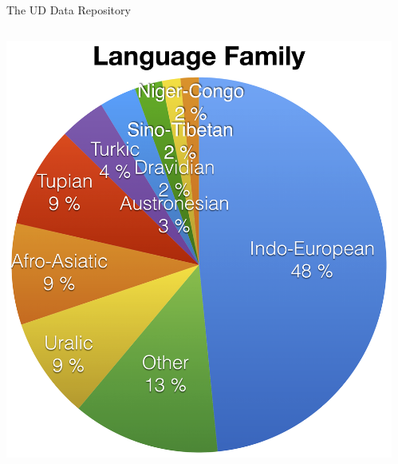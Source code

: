 \documentclass[10pt, compress, aspectratio=169]{beamer}
\begin{document}
\begin{frame}{The UD Data Repository}
\begin{columns}[T] %
\begin{column}{.51\textwidth}
\centering
\includegraphics[scale=0.056]{images/LanguageFamily}
\end{column}%
\hfill%
\begin{column}{.49\textwidth}
{}
\end{column}%
\end{columns}
\end{frame}
\end{document}

